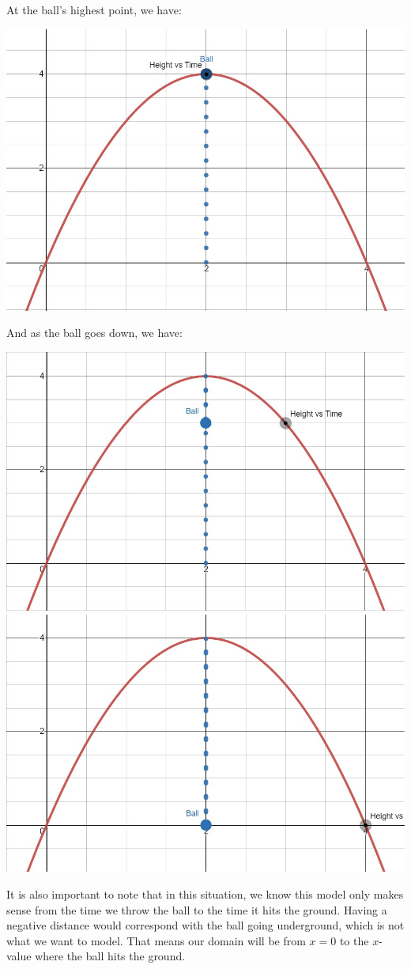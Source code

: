 \documentclass[nooutcomes]{ximera}
\begin{document}
\begin{example}
\begin{explanation}
At the ball's highest point, we have:
\begin{image}
\includegraphics[width=.8\textwidth]{Zeros-BouncingBall4}
\end{image}

And as the ball goes down, we have:
\begin{image}
\includegraphics[width=.8\textwidth]{Zeros-BouncingBall5}
\includegraphics[width=.8\textwidth]{Zeros-BouncingBall6}
\end{image}

It is also important to note that in this situation, we know this model only makes sense from the time we throw the ball to the time it hits the ground.  Having a negative distance would correspond with the ball going underground, which is not what we want to model.  That means our domain will be from $x=0$ to the $x$-value where the ball hits the ground.


\end{explanation}
\end{example}
\end{document}
